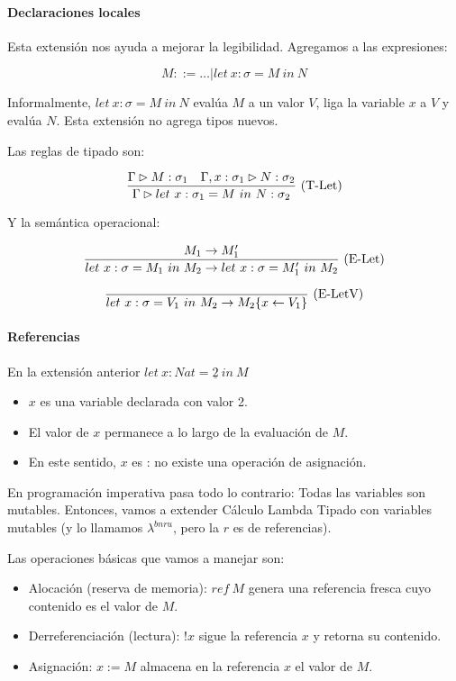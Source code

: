 \paragraph{Declaraciones locales}

Esta extensión nos ayuda a mejorar la legibilidad. Agregamos a las expresiones:

\[M ::= \dots \vert let\ x : \sigma = M\ in\ N\]

Informalmente, $let\ x : \sigma = M\ in\ N$ evalúa $M$ a un valor $V$, liga la variable $x$ a $V$ y evalúa $N$.
Esta extensión no agrega tipos nuevos.

Las reglas de tipado son:

\[\frac{\Gamma \rhd M : \sigma_1\quad \Gamma, x: \sigma_1 \rhd N : \sigma_2}{\Gamma \rhd let\ x : \sigma_1 = M\ in\ N : \sigma_2}\ \text{(T-Let)}\]

Y la semántica operacional:

\[\frac{M_1 \to M_1'}{let\ x : \sigma = M_1\ in\ M_2 \to let\ x : \sigma = M_1'\ in\ M_2}\ \text{(E-Let)}\]

\[\frac{}{let\ x : \sigma = V_1\ in\ M_2 \to M_2\{x \leftarrow V_1\}}\ \text{(E-LetV)}\]

\paragraph{Referencias}

En la extensión anterior $let\ x : Nat = \underline{2}\ in\ M$
\begin{itemize}
  \item $x$ es una variable declarada con valor 2.
  \item El valor de $x$ permanece  a lo largo de la evaluación de $M$.
  \item En este sentido, $x$ es : no existe una operación de asignación.
\end{itemize}

En programación imperativa pasa todo lo contrario: Todas las variables son mutables.
Entonces, vamos a extender Cálculo Lambda Tipado con variables mutables (y lo llamamos $\lambda^{bnru}$, pero la $r$ es de referencias).

Las operaciones básicas que vamos a manejar son:
\begin{itemize}
  \item Alocación (reserva de memoria): $ref\ M$ genera una referencia fresca cuyo contenido es el valor de $M$.
  \item Derreferenciación (lectura): $!x$ sigue la referencia $x$ y retorna su contenido.
  \item Asignación: $x := M$ almacena en la referencia $x$ el valor de $M$.
\end{itemize}

